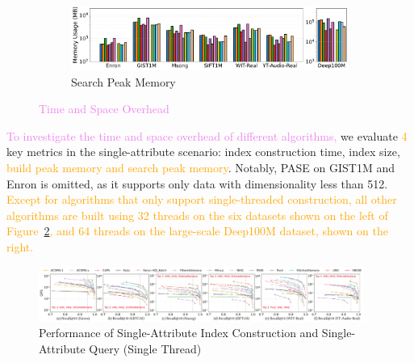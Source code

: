 \documentclass[sigconf, nonacm]{acmart}
\begin{document}
{\begin{figure}[t]
		\begin{subfigure}{\columnwidth}
			\centering
			
			\includegraphics[width=0.99\linewidth]{figures/searchMem/label_memory_comparison.pdf}
			\caption{Search Peak Memory}
			\label{fig:search_memory_mb_comparison}
		\end{subfigure}
		
		\caption{\textcolor{violet}{Time and Space Overhead}}
		\label{fig:build_index_comparison}
	\end{figure}
	
	
	
	\textcolor{violet}{To investigate the time and space overhead of different algorithms,} we evaluate \textcolor{orange}{4} key metrics in the single-attribute scenario: index construction time, index size, \textcolor{orange}{build peak memory and search peak memory}. Notably, PASE on GIST1M and Enron is omitted, as it supports only data with dimensionality less than 512. \textcolor{orange}{Except for algorithms that only support single-threaded construction, all other algorithms are built using 32 threads on the six datasets shown on the left of Figure~\ref{fig:build_index_comparison}, and 64 threads on the large-scale Deep100M dataset, shown on the right.}
	
	
	\begin{figure}
		\centering
		
		\includegraphics[width=0.95\textwidth]{figures/exp/exp_1_1_SingleLabel_1thread.pdf}
		\caption{Performance of Single-Attribute Index Construction and Single-Attribute Query (Single Thread) }
		\label{fig:exp_1_1_SingleLabel_1thread}
	\end{figure}
	
%		
	
}
\end{document}
